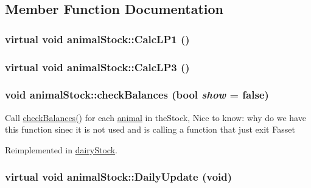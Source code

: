 \subsection{Member Function Documentation}
\hypertarget{classanimal_stock_abc7609a0376b750c4d09918226ed60bf}{
\subsubsection[{CalcLP1}]{\setlength{\rightskip}{0pt plus 5cm}virtual void animalStock::CalcLP1 ()}}
\label{classanimal_stock_abc7609a0376b750c4d09918226ed60bf}
\hypertarget{classanimal_stock_a34875c064b430a79f94ab2b5aab34157}{
\subsubsection[{CalcLP3}]{\setlength{\rightskip}{0pt plus 5cm}virtual void animalStock::CalcLP3 ()}}
\label{classanimal_stock_a34875c064b430a79f94ab2b5aab34157}
\hypertarget{classanimal_stock_aa52ee60094491bbcf82325fd5479f109}{
\subsubsection[{checkBalances}]{\setlength{\rightskip}{0pt plus 5cm}void animalStock::checkBalances (bool {\em show} = {\ttfamily false})}}
\label{classanimal_stock_aa52ee60094491bbcf82325fd5479f109}
Call \hyperlink{classanimal_stock_aa52ee60094491bbcf82325fd5479f109}{checkBalances()} for each \hyperlink{classanimal}{animal} in theStock, Nice to know: why do we have this function sinec it is not used and is calling a function that just exit Fasset 

Reimplemented in \hyperlink{classdairy_stock_a5bc23504c268f65736035b37b94af54a}{dairyStock}.\hypertarget{classanimal_stock_ab95f31939d8d1cbc1bb2f567375995ae}{
\subsubsection[{DailyUpdate}]{\setlength{\rightskip}{0pt plus 5cm}virtual void animalStock::DailyUpdate (void)}}
\label{classanimal_stock_ab95f31939d8d1cbc1bb2f567375995ae}


